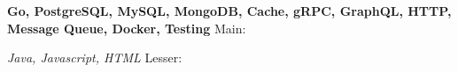 \begin{cventries}

    
\cventry
    {\textbf{Go, PostgreSQL, MySQL, MongoDB, Cache, gRPC, GraphQL, HTTP, Message Queue, Docker, Testing} }
    {Main:}
    {}
    {}
    {
        \iffalse
        \begin{cvitems}
            \item Languages: Go, PHP, C\#, HTML/CSS, Javascript. 
            \item MySQL, ASP.Net, Postman, Apache Tomcat, Linux.
            \item Web services, REST APIs, Auths, SQL, Unit testing.
        \end{cvitems}
        \fi
    }


\cventry
    {\textit{Java, Javascript, HTML} }
    {Lesser:}
    {}
    {}
    {
        \iffalse
        \begin{cvitems}
            \item Nodejs/expressjs, Java, Python, Laravel, Wordpress, Jekyll.
        \end{cvitems}
        \fi
    }
\end{cventries}
